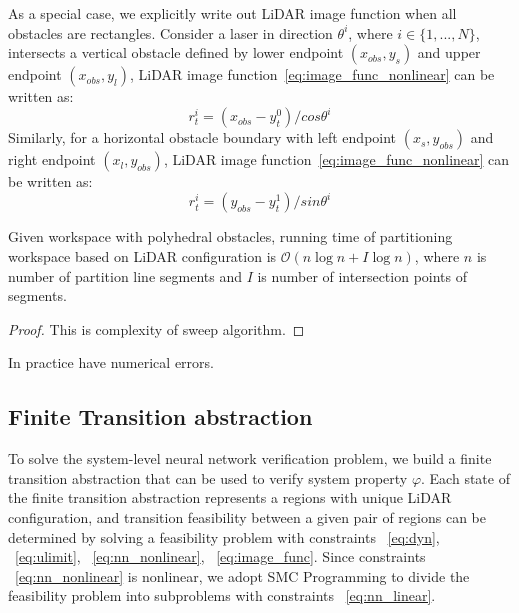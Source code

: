 As a special case, we explicitly write out LiDAR image function when all obstacles are rectangles. 
Consider a laser in direction $\theta^i$, where $i \in \{1, ..., N\}$, intersects a vertical obstacle 
defined by lower endpoint $(x_{obs}, y_{s})$ and upper endpoint $(x_{obs}, y_{l})$, 
LiDAR image function~\eqref{eq:image_func_nonlinear} can be written as:
\begin{equation}
    \label{eq:vertical}
    r_t^i = (x_{obs} - y_t^0) / cos \theta^i
\end{equation}
Similarly, for a horizontal obstacle boundary with left endpoint $(x_{s}, y_{obs})$ and right endpoint $(x_{l}, y_{obs})$,
LiDAR image function~\eqref{eq:image_func_nonlinear} can be written as:
\begin{equation} 
    \label{eq:horizontal}
    r_t^i = (y_{obs} - y_t^1) / sin \theta^i
\end{equation}


\begin{theorem}
    Given workspace with polyhedral obstacles, running time of partitioning workspace based on LiDAR configuration is
    $\mathcal{O}(n\log{}n + I\log{}n)$, where $n$ is number of partition line segments 
    and $I$ is number of intersection points of segments.
    \begin{proof}
        {\color{blue} This is complexity of sweep algorithm.} 
    \end{proof}
\end{theorem}    

{\color{blue} In practice have numerical errors.}




\subsection{Finite Transition abstraction}

To solve the system-level neural network verification problem, 
we build a finite transition abstraction that can be used to verify system property $\varphi$.
Each state of the finite transition abstraction represents a regions with unique LiDAR configuration,
and transition feasibility between a given pair of regions can be determined by solving a feasibility problem 
with constraints ~\eqref{eq:dyn}, ~\eqref{eq:ulimit}, ~\eqref{eq:nn_nonlinear}, ~\eqref{eq:image_func}.
Since constraints ~\eqref{eq:nn_nonlinear} is nonlinear, we adopt SMC Programming to
divide the feasibility problem into subproblems with constraints ~\eqref{eq:nn_linear}.



